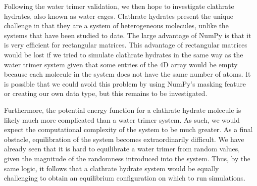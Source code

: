 \documentclass[journal=jacsat,manuscript=article]{achemso}
\begin{document}
Following the water trimer validation, we then hope to investigate clathrate hydrates, also known as water cages. Clathrate hydrates present the unique challenge in that they are a system of heterogeneous molecules, unlike the systems that have been studied to date. The large advantage of NumPy is that it is very efficient for rectangular matrices. This advantage of rectangular matrices would be lost if we tried to simulate clathrate hydrates in the same way as the water trimer system given that some entries of the 4D array would be empty because each molecule in the system does not have the same number of atoms. It is possible that we could avoid this problem by using NumPy’s masking feature or creating our own data type, but this remains to be investigated. 

Furthermore, the potential energy function for a clathrate hydrate molecule is likely much more complicated than a water trimer system. As such, we would expect the computational complexity of the system to be much greater. As a final obstacle, equilibration of the system becomes extraordinarily difficult. We have already seen that it is hard to equilibrate a water trimer from random values, given the magnitude of the randomness introduced into the system. Thus, by the same logic, it follows that a clathrate hydrate system would be equally challenging to obtain an equilibrium configuration on which to run simulations.
\end{document}
